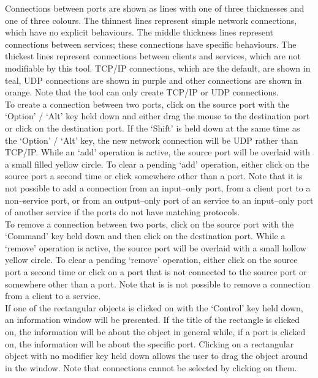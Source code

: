 Connections between ports are shown as lines with one of three thicknesses and one of
three colours.
The thinnest lines represent simple \yarp{} network connections, which have no explicit
behaviours.
The middle thickness lines represent connections between  services; these
connections have specific behaviours.
The thickest lines represent connections between clients and services, which are not
modifiable by this tool.
TCP/IP connections, which are the default, are shown in teal, UDP connections are shown in
purple and other connections are shown in orange.
Note that the tool can only create TCP/IP or UDP connections.\\

To create a connection between two ports, click on the source port with the `Option' /
`Alt' key held down and either drag the mouse to the destination port or click on the
destination port.
If the `Shift' is held down at the same time as the `Option' / `Alt' key, the new
network connection will be UDP rather than TCP/IP.
While an `add' operation is active, the source port will be overlaid with a small filled
yellow circle.
To clear a pending `add' operation, either click on the source port a second time or click
somewhere other than a port.
Note that it is not possible to add a connection from an input--only port, from a client
port to a non--service port, or from an output--only port of an  service to
an input--only port of another  service if the ports do not have matching
protocols.\\

To remove a connection between two ports, click on the source port with the `Command' key
held down and then click on the destination port.
While a `remove' operation is active, the source port will be overlaid with a small
hollow yellow circle.
To clear a pending `remove' operation, either click on the source port a second time or
click on a port that is not connected to the source port or somewhere other than a port.
Note that is is not possible to remove a connection from a client to a service.\\

If one of the rectangular objects is clicked on with the `Control' key held down, an
information window will be presented.
If the title of the rectangle is clicked on, the information will be about the
object in general while, if a port is clicked on, the information will be about the
specific port.
Clicking on a rectangular object with no modifier key held down allows the user to drag
the object around in the window.
Note that connections cannot be selected by clicking on them.\\

